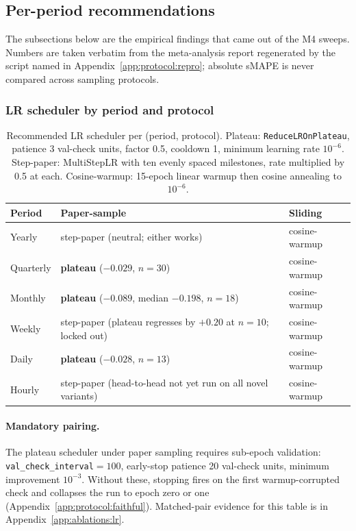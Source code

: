 \subsection{Per-period recommendations}
\label{app:hyperparams:perperiod}

The subsections below are the empirical findings that came out of the M4
sweeps. Numbers are taken verbatim from the meta-analysis report
regenerated by the script named in Appendix~\ref{app:protocol:repro};
absolute sMAPE is never compared across sampling protocols.

\subsubsection{LR scheduler by period and protocol}
\label{app:hyperparams:lr}

\begin{table}[h]
\centering
\small
\caption{Recommended LR scheduler per (period, protocol). Plateau:
\texttt{ReduceLROnPlateau}, patience 3 val-check units, factor 0.5,
cooldown 1, minimum learning rate $10^{-6}$. Step-paper: MultiStepLR with
ten evenly spaced milestones, rate multiplied by 0.5 at each.
Cosine-warmup: 15-epoch linear warmup then cosine annealing to $10^{-6}$.}
\label{tab:lr_per_period}
\begin{tabular}{@{}lll@{}}
\toprule
Period & Paper-sample & Sliding \\
\midrule
Yearly    & step-paper (neutral; either works) & cosine-warmup \\
Quarterly & \textbf{plateau} ($-0.029$, $n=30$) & cosine-warmup \\
Monthly   & \textbf{plateau} ($-0.089$, median $-0.198$, $n=18$) & cosine-warmup \\
Weekly    & step-paper (plateau regresses by $+0.20$ at $n=10$; locked out) & cosine-warmup \\
Daily     & \textbf{plateau} ($-0.028$, $n=13$) & cosine-warmup \\
Hourly    & step-paper (head-to-head not yet run on all novel variants) & cosine-warmup \\
\bottomrule
\end{tabular}
\end{table}

\paragraph{Mandatory pairing.} The plateau scheduler under paper sampling
requires sub-epoch validation: \texttt{val\_check\_interval}$=100$,
early-stop patience 20 val-check units, minimum improvement $10^{-3}$.
Without these, stopping fires on the first warmup-corrupted check and
collapses the run to epoch zero or one
(Appendix~\ref{app:protocol:faithful}). Matched-pair evidence for this
table is in Appendix~\ref{app:ablations:lr}.


